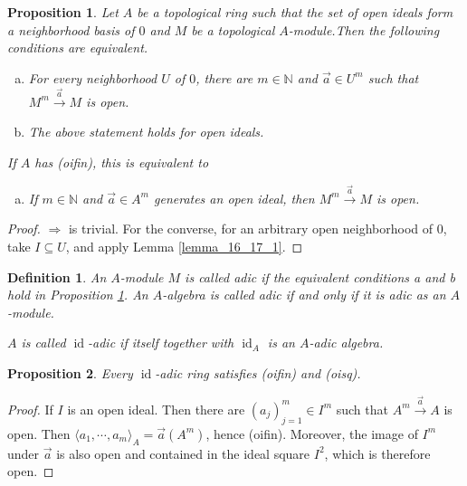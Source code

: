 \documentclass[8pt]{article}
\numberwithin{equation}{section}
\newtheorem{proposition}{Proposition}[subsection]
\newtheorem{definition}{Definition}[subsection]
\DeclareMathOperator{\id}{id}
\newcommand{\N}[0]{\mathbb{N}}
\begin{document}
\begin{proposition}
    \label{fact_16_18}
    Let $A$ be a topological ring such that the set of open ideals form a neighborhood basis of $0$ and $M$ be a topological $A$-module.Then the following conditions are equivalent.
    \begin{enumerate}[a.]
        \item For every neighborhood $U$ of $0$, there are $m\in\N$ and $\vec{a}\in U^m$ such that $M^m\stackrel{\vec{a}}{\to}M$ is open.
        \item The above statement holds for open ideals.%
    \end{enumerate}
    If $A$ has (oifin), this is equivalent to 
    \begin{enumerate}[c.]
        \item If $m\in\N$ and $\vec{a}\in A^m$ generates an open ideal, then $M^m\stackrel{\vec{a}}{\to}M$ is open.%
    \end{enumerate}
\end{proposition}
\begin{proof}
    $\Rightarrow$ is trivial. For the converse, for an arbitrary open neighborhood of $0$, take $I\subseteq U$, and apply Lemma \ref{lemma_16_17_1}.
\end{proof}
\begin{definition}
    An $A$-module $M$ is called adic if the equivalent conditions a and b hold in Proposition \ref{fact_16_18}. An $A$-algebra is called adic if and only if it is adic as an $A$-module.
    \par $A$ is called $\id$-adic if itself together with $\id_A$ is an $A$-adic algebra. %
\end{definition}

\begin{proposition}
    \label{fact_16_19}
    Every $\id$-adic ring satisfies (oifin) and (oisq).
\end{proposition}
\begin{proof}
    If $I$ is an open ideal. Then there are $(a_j)^m_{j=1}\in I^m$ such that $A^m\stackrel{\vec{a}}{\to}A$ is open. Then $\langle a_1,\cdots,a_m\rangle_A = \vec{a}(A^m)$, hence (oifin). 
    Moreover, the image of $I^m$ under $\vec{a}$ is also open and contained in the ideal square $I^2$, which is therefore open.
\end{proof}
\end{document}
